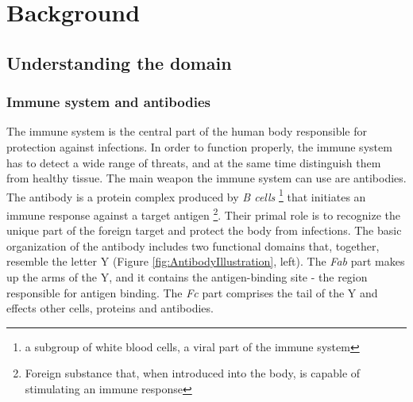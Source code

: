 
\chapter{Background} 

\label{Chapter2} %



\section{Understanding the domain}

\subsection{Immune system and antibodies }

The immune system is the central part of the human body responsible for protection against infections. In order to function properly, the immune system has to detect a wide range of threats, and at the same time distinguish them from  healthy tissue. The main weapon the immune system can use are antibodies.   \\

The antibody is a protein complex produced by \textit{B cells} \footnote{ a subgroup of white blood cells, a viral part of the immune system} that initiates an immune response against a target antigen \footnote{Foreign substance that, when introduced into the body, is capable of stimulating an immune response}. Their primal role is to recognize the unique part of the foreign target and  protect the body from infections. The basic organization of the antibody includes two functional domains that, together, resemble the letter Y (Figure \ref{fig:AntibodyIllustration}, left). The \textit{Fab}  part makes up the arms of the Y, and it contains the antigen-binding site - the region responsible for antigen binding. The \textit{Fc} part comprises the tail of the Y and effects other cells, proteins and antibodies.  \\

